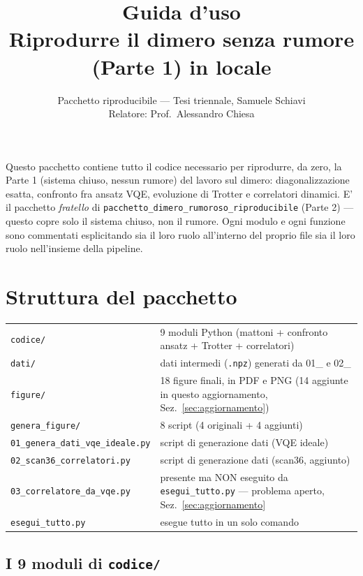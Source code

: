 \documentclass[11pt,a4paper]{article}
\title{\vspace{-1.5em}\color{inkblue}Guida d'uso\\[0.2em]
\Large\normalfont\color{softgray}Riprodurre il dimero senza rumore (Parte 1) in locale}
\author{Pacchetto riproducibile --- Tesi triennale, Samuele Schiavi\\ Relatore: Prof.\ Alessandro Chiesa}
\date{}
\newcommand{\code}[1]{\texttt{\small #1}}
\begin{document}
\sloppy
\maketitle
\thispagestyle{fancy}
\vspace{-2.0em}

Questo pacchetto contiene tutto il codice necessario per riprodurre, da
zero, la Parte 1 (sistema chiuso, nessun rumore) del lavoro sul dimero:
diagonalizzazione esatta, confronto fra ansatz VQE, evoluzione di
Trotter e correlatori dinamici. E' il pacchetto \emph{fratello} di
\code{pacchetto\_dimero\_rumoroso\_riproducibile} (Parte 2) --- questo
copre solo il sistema chiuso, non il rumore. Ogni modulo e ogni funzione
sono commentati esplicitando sia il loro ruolo all'interno del proprio
file sia il loro ruolo nell'insieme della pipeline.

\tableofcontents

\section{Struttura del pacchetto}

\begin{keyeq}
\centering
\begin{tabular}{@{}lp{9.5cm}@{}}
\code{codice/} & 9 moduli Python (mattoni + confronto ansatz + Trotter + correlatori)\\
\code{dati/} & dati intermedi (\code{.npz}) generati da 01\_ e 02\_\\
\code{figure/} & 18 figure finali, in PDF e PNG (14 aggiunte in questo aggiornamento, Sez.~\ref{sec:aggiornamento})\\
\code{genera\_figure/} & 8 script (4 originali + 4 aggiunti)\\
\code{01\_genera\_dati\_vqe\_ideale.py} & script di generazione dati (VQE ideale)\\
\code{02\_scan36\_correlatori.py} & script di generazione dati (scan36, aggiunto)\\
\code{03\_correlatore\_da\_vqe.py} & presente ma NON eseguito da \code{esegui\_tutto.py} --- problema aperto, Sez.~\ref{sec:aggiornamento}\\
\code{esegui\_tutto.py} & esegue tutto in un solo comando\\
\end{tabular}
\end{keyeq}

\subsection{I 9 moduli di \texttt{codice/}}
\end{document}
